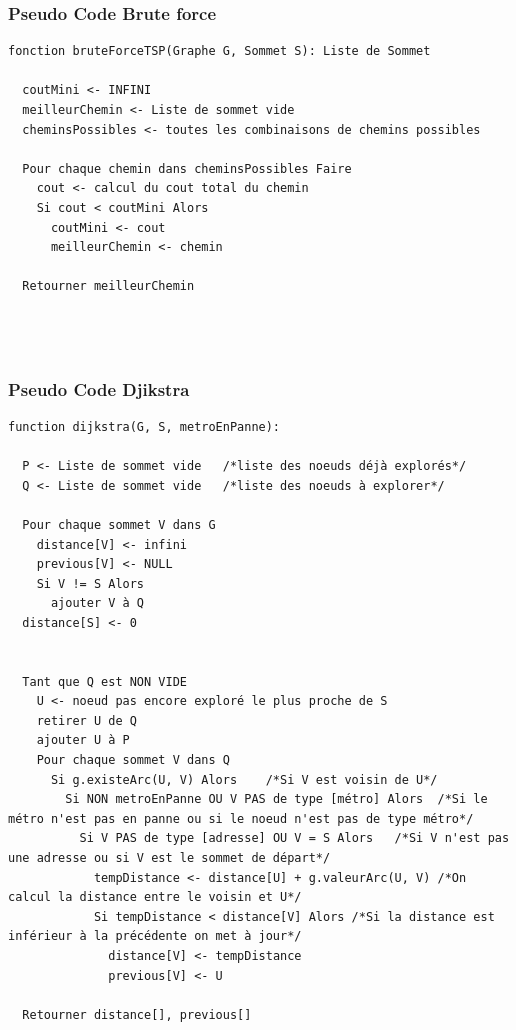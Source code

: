         \newpage

      \subsubsection{Pseudo Code Brute force}
        \begin{lstlisting}
fonction bruteForceTSP(Graphe G, Sommet S): Liste de Sommet

  coutMini <- INFINI
  meilleurChemin <- Liste de sommet vide
  cheminsPossibles <- toutes les combinaisons de chemins possibles

  Pour chaque chemin dans cheminsPossibles Faire
    cout <- calcul du cout total du chemin
    Si cout < coutMini Alors
      coutMini <- cout
      meilleurChemin <- chemin

  Retourner meilleurChemin




        \end{lstlisting}

  \newpage

      \subsubsection{Pseudo Code Djikstra}
        \begin{lstlisting}
function dijkstra(G, S, metroEnPanne):

  P <- Liste de sommet vide   /*liste des noeuds déjà explorés*/
  Q <- Liste de sommet vide   /*liste des noeuds à explorer*/

  Pour chaque sommet V dans G
    distance[V] <- infini
    previous[V] <- NULL
    Si V != S Alors
      ajouter V à Q
  distance[S] <- 0


  Tant que Q est NON VIDE
    U <- noeud pas encore exploré le plus proche de S
    retirer U de Q
    ajouter U à P
    Pour chaque sommet V dans Q
      Si g.existeArc(U, V) Alors    /*Si V est voisin de U*/
        Si NON metroEnPanne OU V PAS de type [métro] Alors  /*Si le métro n'est pas en panne ou si le noeud n'est pas de type métro*/
          Si V PAS de type [adresse] OU V = S Alors   /*Si V n'est pas une adresse ou si V est le sommet de départ*/
            tempDistance <- distance[U] + g.valeurArc(U, V) /*On calcul la distance entre le voisin et U*/
            Si tempDistance < distance[V] Alors /*Si la distance est inférieur à la précédente on met à jour*/
              distance[V] <- tempDistance
              previous[V] <- U

  Retourner distance[], previous[]




        \end{lstlisting}


